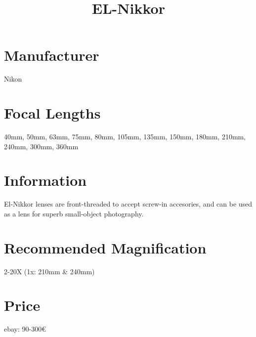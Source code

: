 \documentclass{article}
\begin{document}
\usepackage{titlesec}
\usepackage{graphicx}


\title{EL-Nikkor}
\section{Manufacturer}
Nikon
\section{Focal Lengths}
40mm, 50mm, 63mm, 75mm, 80mm, 105mm, 135mm, 150mm, 180mm, 210mm, 240mm, 300mm, 360mm

\section{Information}

El-Nikkor lenses are front-threaded to accept screw-in accesories, and can be used as a lens for superb small-object photography.

\section{Recommended Magnification}
2-20X (1x: 210mm & 240mm)

\section{Price}
ebay: 90-300€
\end{document}
